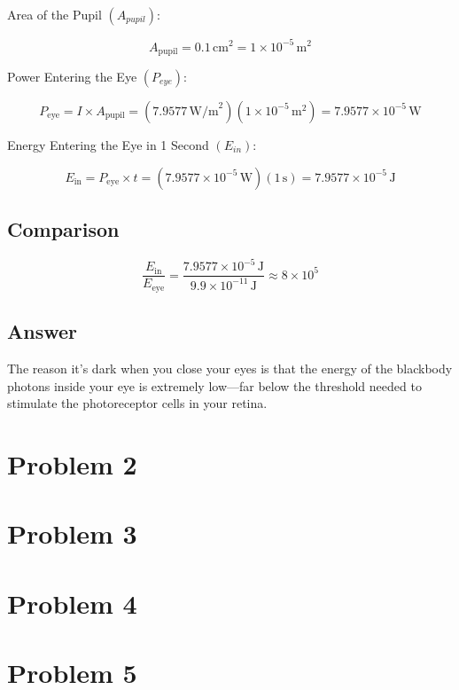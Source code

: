 \documentclass[12pt]{article}
\begin{document}
Area of the Pupil $(A_{pupil})$:

\[
    A_{\text{pupil}}
    = 0.1\, \text{cm}^2
    = 1 \times 10^{-5}\, \text{m}^2
\]

Power Entering the Eye $(P_{eye})$:

\[
    P_{\text{eye}}
    = I \times A_{\text{pupil}}
    = (7.9577\, \text{W/m}^2)(1 \times 10^{-5}\, \text{m}^2)
    = 7.9577 \times 10^{-5}\, \text{W}
\]

Energy Entering the Eye in 1 Second $(E_{in})$:

\[
    E_{\text{in}}
    = P_{\text{eye}} \times t
    = (7.9577 \times 10^{-5}\, \text{W})(1\, \text{s})
    = 7.9577 \times 10^{-5}\, \text{J}
\]

\subsection{Comparison}

\[
    \frac{E_{\text{in}}}{E_{\text{eye}}}
    = \frac{7.9577 \times 10^{-5}\, \text{J}}{9.9 \times 10^{-11}\, \text{J}} \approx 8 \times 10^5
\]

\subsection{Answer}

The reason it's dark when you close your eyes is that the energy of the blackbody photons inside your eye is
extremely low—far below the threshold needed to stimulate the photoreceptor cells in your retina.

\newpage

\section{Problem 2}



\newpage

\section{Problem 3}



\newpage

\section{Problem 4}



\newpage

\section{Problem 5}



\newpage



\nocite{El-Deeb_PEU-438_Assignments}
\end{document}
